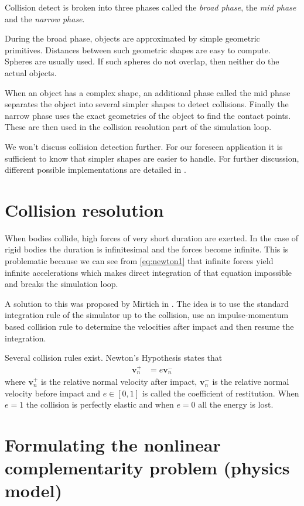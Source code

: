 Collision detect is broken into three phases called the \emph{broad phase}, the \emph{mid phase} and the \emph{narrow phase}. 

During the broad phase, objects are approximated by simple geometric primitives. Distances between such geometric shapes are easy to compute. Spheres are usually used. If such spheres do not overlap, then neither do the actual objects.

When an object has a complex shape, an additional phase called the mid phase separates the object into several simpler shapes to detect collisions. Finally the narrow phase uses the exact geometries of the object to find the contact points. These are then used in the collision resolution part of the simulation loop.

We won't discuss collision detection further. For our foreseen application it is sufficient to know that simpler shapes are easier to handle. For further discussion, different possible implementations are detailed in \cite{jimenez20013d}.

\section{Collision resolution}
When bodies collide, high forces of very short duration are exerted. In the case of rigid bodies the duration is infinitesimal and the forces become infinite. This is problematic because we can see from \cref{eq:newton1} that infinite forces yield infinite accelerations which makes direct integration of that equation impossible and breaks the simulation loop.

A solution to this was proposed by Mirtich in \cite{mirtich1996impulse}. The idea is to use the standard integration rule of the simulator up to the collision, use an impulse-momentum based collision rule to determine the velocities after impact and then resume the integration.

Several collision rules exist. Newton's Hypothesis states that 
\begin{align*}
\mathbf{v}_n^+ &= e\mathbf{v}_n^-
\end{align*}
where $\mathbf{v}_n^+$ is the relative normal velocity after impact, $\mathbf{v}_n^-$ is the relative normal velocity before impact and $e \in [0, 1]$ is called the coefficient of restitution. When $e=1$ the collision is perfectly elastic and when $e=0$ all the energy is lost.

\section{Formulating the nonlinear complementarity problem (physics model)}
